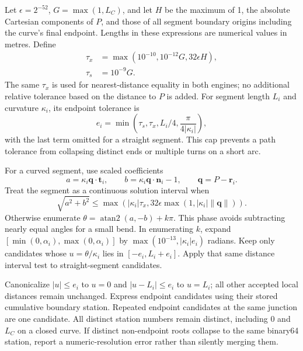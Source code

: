\documentclass[11pt,a4paper]{article}
\begin{document}
Let $\epsilon=2^{-52}$, $G=\max(1,L_C)$, and let $H$ be the maximum of 1,
the absolute Cartesian components of $P$, and those of all segment boundary
origins including the curve's final endpoint. Lengths in these expressions
are numerical values in metres. Define
\begin{align}
 \tau_x &= \max(10^{-10},10^{-12}G,32\epsilon H),\\
 \tau_s &= 10^{-9}G.
\end{align}
The same $\tau_x$ is used for nearest-distance equality in both engines;
no additional relative tolerance based on the distance to $P$ is added.
For segment length $L_i$ and curvature $\kappa_i$, its endpoint tolerance is
\begin{equation}
 e_i=\min\left(\tau_s,\tau_x,L_i/4,
          \frac{\pi}{4|\kappa_i|}\right),
\end{equation}
with the last term omitted for a straight segment. This cap prevents a path
tolerance from collapsing distinct ends or multiple turns on a short arc.

For a curved segment, use scaled coefficients
\begin{equation}
 a=\kappa_i\mathbf{q}\cdot\mathbf{t}_i,\qquad
 b=\kappa_i\mathbf{q}\cdot\mathbf{n}_i-1,
 \qquad \mathbf{q}=P-\mathbf{r}_i.
\end{equation}
Treat the segment as a continuous solution interval when
\begin{equation}
 \sqrt{a^2+b^2}\le
 \max\left(|\kappa_i|\tau_x,
      32\epsilon\max(1,|\kappa_i|\lVert\mathbf{q}\rVert)\right).
\end{equation}
Otherwise enumerate $\theta=\operatorname{atan2}(a,-b)+k\pi$. This phase
avoids subtracting nearly equal angles for a small bend. In enumerating $k$,
expand $[\min(0,\alpha_i),\max(0,\alpha_i)]$ by
$\max(10^{-13},|\kappa_i|e_i)$ radians. Keep only candidates whose
$u=\theta/\kappa_i$ lies in $[-e_i,L_i+e_i]$. Apply that same distance
interval test to straight-segment candidates.

Canonicalize $|u|\le e_i$ to $u=0$ and
$|u-L_i|\le e_i$ to $u=L_i$; all other accepted local distances remain
unchanged. Express endpoint candidates using their stored cumulative boundary
station. Repeated endpoint candidates at the same junction are one candidate.
All distinct station numbers remain distinct, including 0 and $L_C$ on a
closed curve. If distinct non-endpoint roots collapse to the same binary64
station, report a numeric-resolution error rather than silently merging them.
\end{document}
